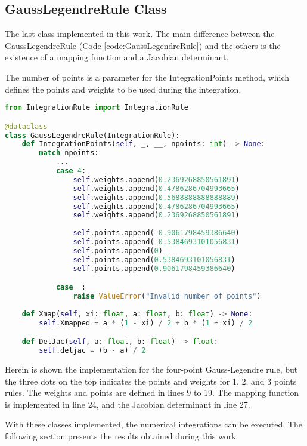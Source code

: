 \subsection{GaussLegendreRule Class}
The last class implemented in this work. The main difference between the GaussLegendreRule (Code \ref{code:GaussLegendreRule}) and the others is the existence of a mapping function and a Jacobian determinant. 

The number of points is a parameter for the IntegrationPoints method, which defines the points and weights to be used during the integration.
\begin{lstlisting}[language=python, caption={GaussLegendreRule Class.}, label={code:GaussLegendreRule}]
from IntegrationRule import IntegrationRule

@dataclass
class GaussLegendreRule(IntegrationRule):
    def IntegrationPoints(self, _, __, npoints: int) -> None:
        match npoints:
            ...
            case 4:
                self.weights.append(0.2369268850561891)
                self.weights.append(0.4786286704993665)
                self.weights.append(0.5688888888888889)
                self.weights.append(0.4786286704993665)
                self.weights.append(0.2369268850561891)
                
                self.points.append(-0.9061798459386640)
                self.points.append(-0.5384693101056831)
                self.points.append(0)
                self.points.append(0.5384693101056831)
                self.points.append(0.9061798459386640)

            case _:
                raise ValueError("Invalid number of points")
            
    def Xmap(self, xi: float, a: float, b: float) -> None:
        self.Xmapped = a * (1 - xi) / 2 + b * (1 + xi) / 2

    def DetJac(self, a: float, b: float) -> float:
        self.detjac = (b - a) / 2
\end{lstlisting}

Herein is shown the implementation for the four-point Gauss-Legendre rule, but the three dots on the top indicates the points and weights for 1, 2, and 3 points rules. The weights and points are defined in lines 9 to 19. The mapping function is implemented in line 24, and the Jacobian determinant in line 27.

With these classes implemented, the numerical integrations can be executed. The following section presents the results obtained during this work.  
